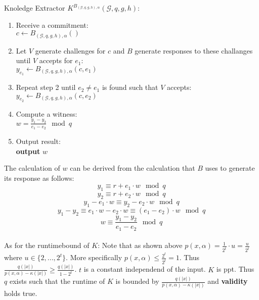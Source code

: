 \documentclass[12pt,pdftex,a4paper]{article}
\newcommand\tab[1][1cm]{\hspace*{#1}}
\begin{document}
\begin{itemize}
Knoledge Extractor $K^{B_{(\mathcal{G}, q, g, h), \alpha}}(\mathcal{G}, q, g, h):$
\begin{enumerate}
\item Receive a commitment:\\
\tab $c \leftarrow B_{(\mathcal{G}, q, g, h), \alpha}()$

\item Let $V$ generate challenges for $c$ and $B$ generate responses to these challanges until $V$ accepts for $e_1$:\\
\tab $y_{e_1} \leftarrow B_{(\mathcal{G}, q, g, h), \alpha}(c, e_1)$

\item Repeat step 2 until $e_2\neq e_1$ is found such that $V$ accepts:\\
\tab $y_{e_2} \leftarrow B_{(\mathcal{G}, q, g, h), \alpha}(c, e_2)$

\item Compute a witness:\\
\tab $w = \frac{y_1-y_2}{e_1-e_2} \mod q$

\item Output result:\\
\tab \textbf{output} $w$
\end{enumerate}
The calculation of $w$ can be derived from the calculation that $B$ uses to generate its response as follows:\\
$$y_1 \equiv r + e_1\cdot w \mod q$$
$$y_2 \equiv r + e_2\cdot w \mod q$$
$$y_1 - e_1\cdot w \equiv y_2 - e_2\cdot w \mod q$$
$$y_1-y_2 \equiv e_1 \cdot w - e_2 \cdot w \equiv (e_1-e_2)\cdot w\mod q$$
$$w \equiv \frac{y_1-y_2}{e_1-e_2} \mod q$$
\\
As for the runtimebound of $K$: Note that as shown above $p(x, \alpha) = \frac{1}{2^t}\cdot u = \frac{u}{2^t}$ where $u\in \{2,...,2^t\}$. More specifically $p(x, \alpha)\leq \frac{2^t}{2^t} = 1$. Thus $\frac{q(|x|)}{p(x, \alpha)-\kappa(|x|)} \geq \frac{q(|x|)}{1 - 2^t}$. $t$ is a constant independend of the input. $K$ is ppt. Thus $q$ exists such that the runtime of $K$ is bounded by $\frac{q(|x|)}{p(x, \alpha)-\kappa(|x|)}$ and \textbf{validity} holds true.
\end{itemize}
\end{document}

